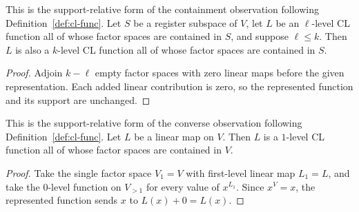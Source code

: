 \begin{lemma}\label{lem:cl-level-mono}
	\leanok
	This is the support-relative form of the containment observation following Definition~\ref{def:cl-func}. Let $S$ be a register subspace of $V$, let $L$ be an $\ell$-level CL function all of whose factor spaces are contained in $S$, and suppose $\ell \le k$. Then $L$ is also a $k$-level CL function all of whose factor spaces are contained in $S$.
\end{lemma}
\begin{proof}
	\leanok
	Adjoin $k-\ell$ empty factor spaces with zero linear maps before the given representation. Each added linear contribution is zero, so the represented function and its support are unchanged.
\end{proof}

\begin{lemma}\label{lem:cl-one-level-linear}
	\leanok
	This is the support-relative form of the converse observation following Definition~\ref{def:cl-func}. Let $L$ be a linear map on $V$. Then $L$ is a $1$-level CL function all of whose factor spaces are contained in $V$.
\end{lemma}
\begin{proof}
	\leanok
	Take the single factor space $V_1 = V$ with first-level linear map $L_1 = L$, and take the $0$-level function on $V_{>1}$ for every value of $x^{L_1}$. Since $x^V = x$, the represented function sends $x$ to $L(x) + 0 = L(x)$.
\end{proof}

